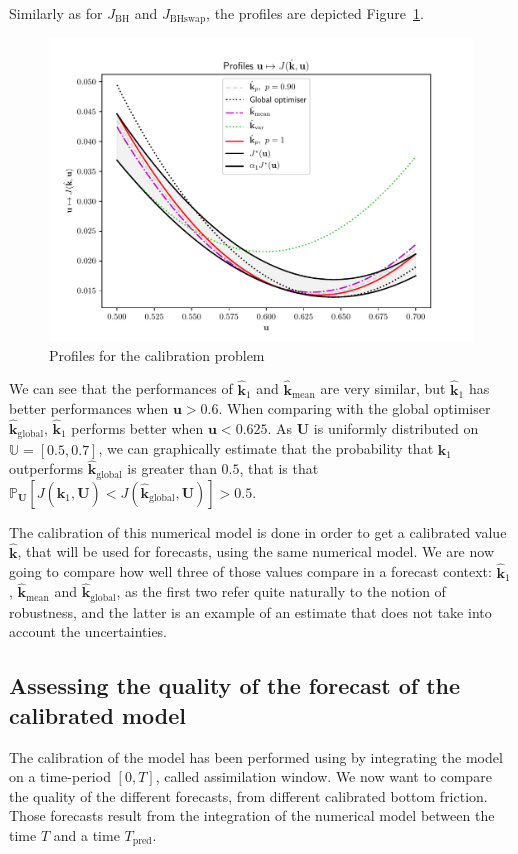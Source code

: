 \documentclass[preprint, 1p]{elsarticle}
\newcommand{\Prob}{\mathbb{P}}
\newcommand{\hatkmean}{\hat{\mathbf{k}}_{\mathrm{mean}}}
\newcommand{\kest}{\hat{\mathbf{k}}}
\newcommand{\Uspace}{\mathbb{U}}
\newcommand{\JBH}{J_{\mathrm{BH}}}
\newcommand{\JBHS}{J_{\mathrm{BHswap}}}
\begin{document}
Similarly as for $\JBH$ and $\JBHS$, the profiles are depicted Figure~\ref{fig:profiles_swe}.
\begin{figure}[!h]
  \centering
  \includegraphics[width=.8\textwidth]{Figures/profile_swe}
  \caption{Profiles for the calibration problem}
\label{fig:profiles_swe}
\end{figure}
We can see that the performances of $\kest_1$ and $\hatkmean$ are very similar, but $\kest_1$ has better performances when $\mathbf{u} > 0.6$. When comparing with the global optimiser $\kest_{\mathrm{global}}$, $\kest_1$ performs better when $\mathbf{u}<0.625$. As $\mathbf{U}$ is uniformly distributed on $\Uspace=[0.5,0.7]$, we can graphically estimate that the probability that $\kest_1$ outperforms $\kest_{\mathrm{global}}$ is greater than $0.5$, that is that $\Prob_\mathbf{U}\left[J(\kest_1,\mathbf{U})<J(\kest_{\mathrm{global}},\mathbf{U})\right] > 0.5$.


The calibration of this numerical model is done in order to get a calibrated value $\kest$, that will be used for forecasts, using the same numerical model. We are now going to compare how well three of those values compare in a forecast context: $\kest_1$, $\hatkmean$ and $\kest_{\mathrm{global}}$, as the first two refer quite naturally to the notion of robustness, and the latter is an example of an estimate that does not take into account the uncertainties.
\clearpage
\subsection{Assessing the quality of the forecast of the calibrated model}
The calibration of the model has been performed using by integrating the model on a time-period $[0, T]$, called assimilation window. 
We now want to compare the quality of the different forecasts, from different calibrated bottom friction.
Those forecasts result from the integration of the numerical model between the time $T$ and a time $T_{\mathrm{pred}}$.
\end{document}
